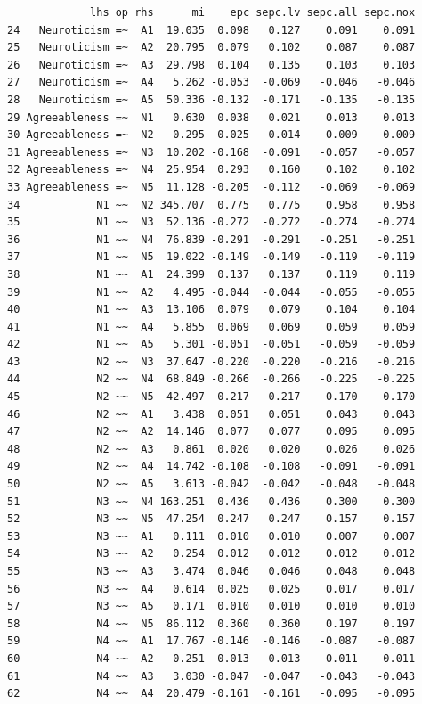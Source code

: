 \documentclass[
  letterpaper,
  DIV=11,
  numbers=noendperiod]{scrreprt}
\begin{document}
\begin{verbatim}
             lhs op rhs      mi    epc sepc.lv sepc.all sepc.nox
24   Neuroticism =~  A1  19.035  0.098   0.127    0.091    0.091
25   Neuroticism =~  A2  20.795  0.079   0.102    0.087    0.087
26   Neuroticism =~  A3  29.798  0.104   0.135    0.103    0.103
27   Neuroticism =~  A4   5.262 -0.053  -0.069   -0.046   -0.046
28   Neuroticism =~  A5  50.336 -0.132  -0.171   -0.135   -0.135
29 Agreeableness =~  N1   0.630  0.038   0.021    0.013    0.013
30 Agreeableness =~  N2   0.295  0.025   0.014    0.009    0.009
31 Agreeableness =~  N3  10.202 -0.168  -0.091   -0.057   -0.057
32 Agreeableness =~  N4  25.954  0.293   0.160    0.102    0.102
33 Agreeableness =~  N5  11.128 -0.205  -0.112   -0.069   -0.069
34            N1 ~~  N2 345.707  0.775   0.775    0.958    0.958
35            N1 ~~  N3  52.136 -0.272  -0.272   -0.274   -0.274
36            N1 ~~  N4  76.839 -0.291  -0.291   -0.251   -0.251
37            N1 ~~  N5  19.022 -0.149  -0.149   -0.119   -0.119
38            N1 ~~  A1  24.399  0.137   0.137    0.119    0.119
39            N1 ~~  A2   4.495 -0.044  -0.044   -0.055   -0.055
40            N1 ~~  A3  13.106  0.079   0.079    0.104    0.104
41            N1 ~~  A4   5.855  0.069   0.069    0.059    0.059
42            N1 ~~  A5   5.301 -0.051  -0.051   -0.059   -0.059
43            N2 ~~  N3  37.647 -0.220  -0.220   -0.216   -0.216
44            N2 ~~  N4  68.849 -0.266  -0.266   -0.225   -0.225
45            N2 ~~  N5  42.497 -0.217  -0.217   -0.170   -0.170
46            N2 ~~  A1   3.438  0.051   0.051    0.043    0.043
47            N2 ~~  A2  14.146  0.077   0.077    0.095    0.095
48            N2 ~~  A3   0.861  0.020   0.020    0.026    0.026
49            N2 ~~  A4  14.742 -0.108  -0.108   -0.091   -0.091
50            N2 ~~  A5   3.613 -0.042  -0.042   -0.048   -0.048
51            N3 ~~  N4 163.251  0.436   0.436    0.300    0.300
52            N3 ~~  N5  47.254  0.247   0.247    0.157    0.157
53            N3 ~~  A1   0.111  0.010   0.010    0.007    0.007
54            N3 ~~  A2   0.254  0.012   0.012    0.012    0.012
55            N3 ~~  A3   3.474  0.046   0.046    0.048    0.048
56            N3 ~~  A4   0.614  0.025   0.025    0.017    0.017
57            N3 ~~  A5   0.171  0.010   0.010    0.010    0.010
58            N4 ~~  N5  86.112  0.360   0.360    0.197    0.197
59            N4 ~~  A1  17.767 -0.146  -0.146   -0.087   -0.087
60            N4 ~~  A2   0.251  0.013   0.013    0.011    0.011
61            N4 ~~  A3   3.030 -0.047  -0.047   -0.043   -0.043
62            N4 ~~  A4  20.479 -0.161  -0.161   -0.095   -0.095

\end{verbatim}
\end{document}
